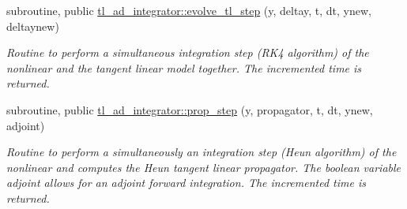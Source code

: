 \begin{DoxyCompactItemize}
subroutine, public \hyperlink{namespacetl__ad__integrator_a9fb60b4a88b0c5d6ca27b58440a32f74}{tl\+\_\+ad\+\_\+integrator\+::evolve\+\_\+tl\+\_\+step} (y, deltay, t, dt, ynew, deltaynew)
\begin{DoxyCompactList}\small\item\em Routine to perform a simultaneous integration step (R\+K4 algorithm) of the nonlinear and the tangent linear model together. The incremented time is returned. \end{DoxyCompactList}\item 
subroutine, public \hyperlink{namespacetl__ad__integrator_a76538a8bd594899e94228abaa34b48cd}{tl\+\_\+ad\+\_\+integrator\+::prop\+\_\+step} (y, propagator, t, dt, ynew, adjoint)
\begin{DoxyCompactList}\small\item\em Routine to perform a simultaneously an integration step (Heun algorithm) of the nonlinear and computes the Heun tangent linear propagator. The boolean variable adjoint allows for an adjoint forward integration. The incremented time is returned. \end{DoxyCompactList}\end{DoxyCompactItemize}
